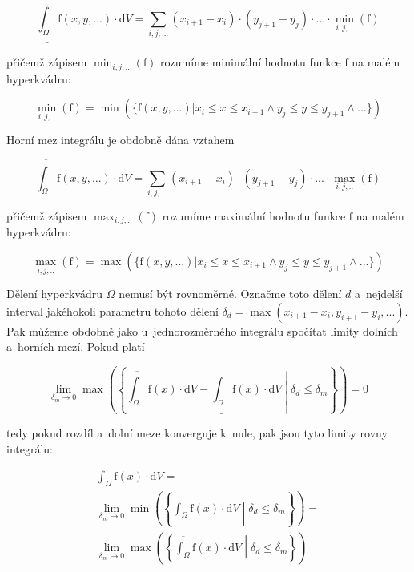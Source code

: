 \begin{equation}
\label{eq:dolni_mez_vicerozmerneho_integralu}
\underline{\int_{\Omega}} \mathrm{f}(x, y, ...) \cdot \mathrm{d}V = \sum_{i, j, ...} (x_{i+1} - x_i) \cdot (y_{j+1} - y_j) \cdot ... \cdot \min_{i, j, ..}(\mathrm{f})
\end{equation}

přičemž zápisem \(\min_{i, j, ..}(\mathrm{f})\) rozumíme minimální hodnotu funkce \(\mathrm{f}\) na malém hyperkvádru:

\begin{equation}
\min_{i, j, ..}(\mathrm{f}) = \min(\{\mathrm{f}(x, y, ...) | x_i \leq x \leq x_{i+1} \land y_j \leq y \leq y_{j+1} \land ...\})
\end{equation}

Horní mez integrálu je obdobně dána vztahem

\begin{equation}
\label{eq:horni_mez_vicerozmerneho_integralu}
\overline{\int_{\Omega}} \mathrm{f}(x, y, ...) \cdot \mathrm{d}V = \sum_{i, j, ...} (x_{i+1} - x_i) \cdot (y_{j+1} - y_j) \cdot ... \cdot \max_{i, j, ..}(\mathrm{f})
\end{equation}

přičemž zápisem \(\max_{i, j, ..}(\mathrm{f})\) rozumíme maximální hodnotu funkce \(\mathrm{f}\) na malém hyperkvádru:

\begin{equation}
\max_{i, j, ..}(\mathrm{f}) = \max(\{\mathrm{f}(x, y, ...) | x_i \leq x \leq x_{i+1} \land y_j \leq y \leq y_{j+1} \land ...\})
\end{equation}

Dělení hyperkvádru \(\Omega\) nemusí být rovnoměrné. Označme toto dělení \(d\) a~nejdelší interval jakéhokoli parametru tohoto dělení \(\delta_d = \max(x_{i+1} - x_i, y_{i+1} - y_i, ...)\). Pak můžeme obdobně jako u~jednorozměrného integrálu spočítat limity dolních a~horních mezí. Pokud platí

\begin{equation}
\lim_{\delta_m \to 0} \max \left(\left\{\overline{\int_{\Omega}} \mathrm{f}(x) \cdot \mathrm{d}V - \underline{\int_{\Omega}} \mathrm{f}(x) \cdot \mathrm{d}V \middle| \delta_d \leq \delta_m \right\}\right) = 0
\end{equation}

tedy pokud rozdíl a~dolní meze konverguje k~nule, pak jsou tyto limity rovny integrálu:

\begin{equation}
\begin{split}
\int_{\Omega} \mathrm{f}(x) \cdot \mathrm{d}V = \\
\lim_{\delta_m \to 0} \min \left(\left\{\underline{\int_{\Omega}} \mathrm{f}(x) \cdot \mathrm{d}V \middle| \delta_d \leq \delta_m \right\}\right) = \\
\lim_{\delta_m \to 0} \max \left(\left\{\overline{\int_{\Omega}} \mathrm{f}(x) \cdot \mathrm{d}V \middle| \delta_d \leq \delta_m \right\}\right)
\end{split}
\end{equation}


